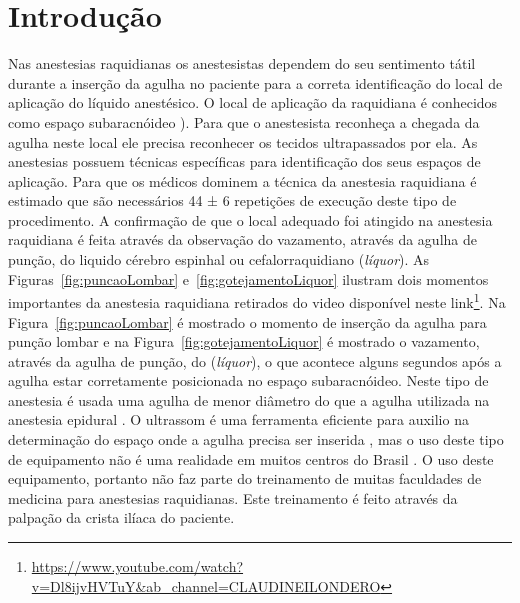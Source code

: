 



\chapter{Introdução}
\label{cap:introducao}

Nas anestesias raquidianas os anestesistas dependem do seu sentimento tátil durante a inserção da agulha no paciente para a correta identificação do local de aplicação do líquido anestésico. O local de aplicação da raquidiana é conhecidos como espaço subaracnóideo \cite{Miller2009}). Para que o anestesista reconheça a chegada da agulha neste local ele precisa reconhecer os tecidos ultrapassados por ela. As anestesias possuem técnicas específicas para identificação dos seus espaços de aplicação. Para que os médicos dominem a técnica da anestesia raquidiana é estimado que são necessários 44 ± 6 repetições de execução deste tipo de procedimento. A confirmação de que o local adequado foi atingido na anestesia raquidiana é feita através da observação do vazamento, através da agulha de punção, do liquido cérebro espinhal ou cefalorraquidiano (\textit{líquor}). As Figuras~\ref{fig:puncaoLombar} e~\ref{fig:gotejamentoLiquor} ilustram dois momentos importantes da anestesia raquidiana retirados do video disponível neste link\footnote{\url{https://www.youtube.com/watch?v=Dl8ijvHVTuY&ab\_channel=CLAUDINEILONDERO}}. Na Figura~\ref{fig:puncaoLombar} é mostrado o momento de inserção da agulha para punção lombar e na Figura~\ref{fig:gotejamentoLiquor} é mostrado o vazamento, através da agulha de punção, do (\textit{líquor}), o que acontece alguns segundos após a agulha estar corretamente posicionada no espaço subaracnóideo. Neste tipo de anestesia é usada uma agulha de menor diâmetro do que a agulha utilizada na anestesia epidural \cite{Miller2009}. O ultrassom é uma ferramenta eficiente para auxilio na determinação do espaço onde a agulha precisa ser inserida \cite{Helayel2010}, mas o uso deste tipo de equipamento não é uma realidade em muitos centros do Brasil \cite{Hamaji2016}. O uso deste equipamento, portanto não faz parte do treinamento de muitas faculdades de medicina para anestesias raquidianas. Este treinamento é feito através da palpação da crista ilíaca do paciente.

